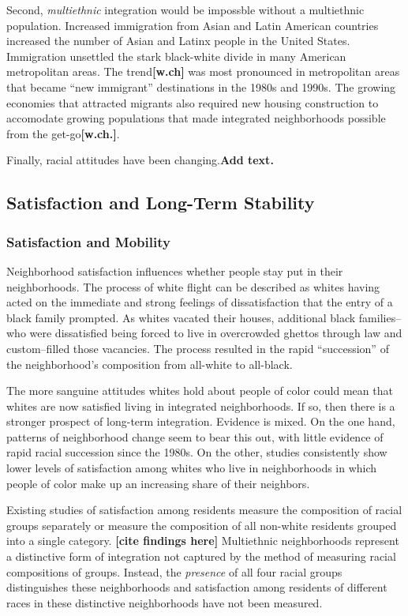 \documentclass{baderart}
\begin{document}
Second, \emph{multiethnic} integration would be impossble without a multiethnic population. Increased immigration from Asian and Latin American countries increased the number of Asian and Latinx people in the United States. Immigration unsettled the stark black-white divide in many American metropolitan areas. The trend\textbf{{[}w.ch{]}} was most pronounced in metropolitan areas that became ``new immigrant'' destinations in the 1980s and 1990s. The growing economies that attracted migrants also required new housing construction to accomodate growing populations that made integrated neighborhoods possible from the get-go\textbf{{[}w.ch.{]}}.

Finally, racial attitudes have been changing.\textbf{Add text.}


\subsection{Satisfaction and Long-Term Stability}\label{satisfaction-and-long-term-stability}

\subsubsection{Satisfaction and Mobility}\label{satisfaction-and-mobility}

Neighborhood satisfaction influences whether people stay put in their neighborhoods. The process of white flight can be described as whites having acted on the immediate and strong feelings of dissatisfaction that the entry of a black family prompted. As whites vacated their houses, additional black families--who were dissatisfied being forced to live in overcrowded ghettos through law and custom--filled those vacancies. The process resulted in the rapid ``succession'' of the neighborhood's composition from all-white to all-black.

The more sanguine attitudes whites hold about people of color could mean that whites are now satisfied living in integrated neighborhoods. If so, then there is a stronger prospect of long-term integration. Evidence is mixed. On the one hand, patterns of neighborhood change seem to bear this out, with little evidence of rapid racial succession since the 1980s. On the other, studies consistently show lower levels of satisfaction among whites who live in neighborhoods in which people of color make up an increasing share of their neighbors.

Existing studies of satisfaction among residents measure the composition of racial groups separately or measure the composition of all non-white residents grouped into a single category. \textbf{{[}cite findings here{]}} Multiethnic neighborhoods represent a distinctive form of integration not captured by the method of measuring racial compositions of groups. Instead, the \emph{presence} of all four racial groups distinguishes these neighborhoods and satisfaction among residents of different races in these distinctive neighborhoods have not been measured.
\end{document}
